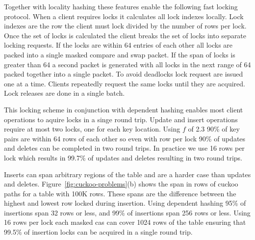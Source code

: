 Together with locality hashing these features enable the
following fast locking protocol. When a client requires
locks it calculates all lock indexes locally. Lock indexes
are the row the client must lock divided by the number of
rows per lock. Once the set of locks is calculated the
client breaks the set of locks into separate locking
requests. If the locks are within 64 entries of each other
all locks are packed into a single masked compare and swap
packet. If the span of locks is greater than 64 a second
packet is generated with all locks in the next range of 64
packed together into a single packet. To avoid deadlocks
lock request are issued one at a time. Clients repeatedly
request the same locks until they are acquired. Lock
releases are done in a single batch.


This locking scheme in conjunction with dependent hashing
enables most client operations to aquire locks in a singe
round trip. Update and insert operations require at most two
locks, one for each key location. Using $f$ of 2.3 90\% of
key pairs are within 64 rows of each other so even with row
per lock 90\% of updates and deletes can be completed in two
round trips. In practice we use 16 rows per lock which
results in 99.7\% of updates and deletes resulting in two
round trips.

Inserts can span arbitrary regions of the table and are a
harder case than updates and deletes.
Figure~\ref{fig:cuckoo-problems}(b) shows the span in rows
of cuckoo paths for a table with 100K rows. These spans are
the difference between the highest and lowest row locked
during insertion. Using dependent hashing 95\% of insertions
span 32 rows or less, and 99\% of insertions span 256 rows
or less. Using 16 rows per lock each masked cas can cover
1024 rows of the table ensuring that 99.5\% of insertion
locks can be acquired in a single round trip.


